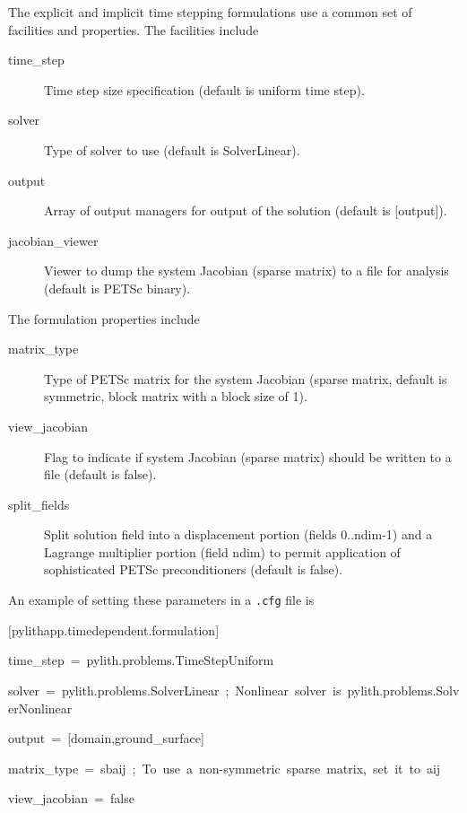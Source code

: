 The explicit and implicit time stepping formulations use a common
set of facilities and properties. The facilities include
\begin{description}
\item [{time\_step}] Time step size specification (default is uniform time
step).
\item [{solver}] Type of solver to use (default is SolverLinear).
\item [{output}] Array of output managers for output of the solution (default
is {[}output{]}).
\item [{jacobian\_viewer}] Viewer to dump the system Jacobian (sparse matrix)
to a file for analysis (default is PETSc binary).
\end{description}
The formulation properties include
\begin{description}
\item [{matrix\_type}] Type of PETSc matrix for the system Jacobian (sparse
matrix, default is symmetric, block matrix with a block size of 1).
\item [{view\_jacobian}] Flag to indicate if system Jacobian (sparse matrix)
should be written to a file (default is false).
\item [{split\_fields}] Split solution field into a displacement portion
(fields 0..ndim-1) and a Lagrange multiplier portion (field ndim)
to permit application of sophisticated PETSc preconditioners (default
is false).
\end{description}
An example of setting these parameters in a \texttt{.cfg} file is
\begin{lyxcode}
{\footnotesize{}{[}pylithapp.timedependent.formulation{]}}{\footnotesize \par}

{\footnotesize{}time\_step~=~pylith.problems.TimeStepUniform}{\footnotesize \par}

{\footnotesize{}solver~=~pylith.problems.SolverLinear~;~Nonlinear~solver~is~pylith.problems.SolverNonlinear}{\footnotesize \par}

{\footnotesize{}output~=~{[}domain,ground\_surface{]}}{\footnotesize \par}

{\footnotesize{}matrix\_type~=~sbaij~;~To~use~a~non-symmetric~sparse~matrix,~set~it~to~aij}{\footnotesize \par}

{\footnotesize{}view\_jacobian~=~false}{\footnotesize \par}
\end{lyxcode}


